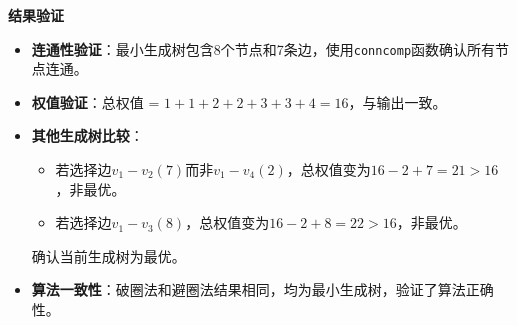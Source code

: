 \textbf{结果验证}
\begin{itemize}
    \item \textbf{连通性验证}：最小生成树包含8个节点和7条边，使用\texttt{conncomp}函数确认所有节点连通。
    \item \textbf{权值验证}：总权值 = \( 1 + 1 + 2 + 2 + 3 + 3 + 4 = 16 \)，与输出一致。
    \item \textbf{其他生成树比较}：
    \begin{itemize}
        \item 若选择边\( v_1-v_2 (7) \)而非\( v_1-v_4 (2) \)，总权值变为\( 16 - 2 + 7 = 21 > 16 \)，非最优。
        \item 若选择边\( v_1-v_3 (8) \)，总权值变为\( 16 - 2 + 8 = 22 > 16 \)，非最优。
    \end{itemize}
    确认当前生成树为最优。
    \item \textbf{算法一致性}：破圈法和避圈法结果相同，均为最小生成树，验证了算法正确性。
\end{itemize}

